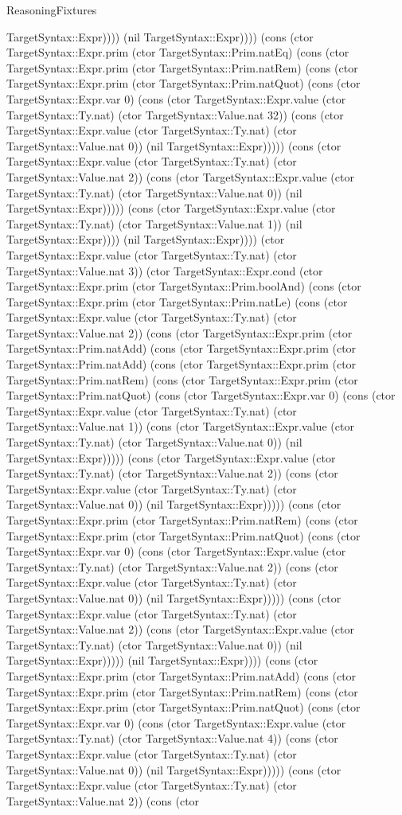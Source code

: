 \begin{lexlean}{ReasoningFixtures}
\begin{semanticmodule}
{TargetSyntax::Expr)))) (nil TargetSyntax::Expr)))) (cons (ctor TargetSyntax::Expr.prim (ctor TargetSyntax::Prim.natEq) (cons (ctor TargetSyntax::Expr.prim (ctor TargetSyntax::Prim.natRem) (cons (ctor TargetSyntax::Expr.prim (ctor TargetSyntax::Prim.natQuot) (cons (ctor TargetSyntax::Expr.var 0) (cons (ctor TargetSyntax::Expr.value (ctor TargetSyntax::Ty.nat) (ctor TargetSyntax::Value.nat 32)) (cons (ctor TargetSyntax::Expr.value (ctor TargetSyntax::Ty.nat) (ctor TargetSyntax::Value.nat 0)) (nil TargetSyntax::Expr))))) (cons (ctor TargetSyntax::Expr.value (ctor TargetSyntax::Ty.nat) (ctor TargetSyntax::Value.nat 2)) (cons (ctor TargetSyntax::Expr.value (ctor TargetSyntax::Ty.nat) (ctor TargetSyntax::Value.nat 0)) (nil TargetSyntax::Expr))))) (cons (ctor TargetSyntax::Expr.value (ctor TargetSyntax::Ty.nat) (ctor TargetSyntax::Value.nat 1)) (nil TargetSyntax::Expr)))) (nil TargetSyntax::Expr)))) (ctor TargetSyntax::Expr.value (ctor TargetSyntax::Ty.nat) (ctor TargetSyntax::Value.nat 3)) (ctor TargetSyntax::Expr.cond (ctor TargetSyntax::Expr.prim (ctor TargetSyntax::Prim.boolAnd) (cons (ctor TargetSyntax::Expr.prim (ctor TargetSyntax::Prim.natLe) (cons (ctor TargetSyntax::Expr.value (ctor TargetSyntax::Ty.nat) (ctor TargetSyntax::Value.nat 2)) (cons (ctor TargetSyntax::Expr.prim (ctor TargetSyntax::Prim.natAdd) (cons (ctor TargetSyntax::Expr.prim (ctor TargetSyntax::Prim.natAdd) (cons (ctor TargetSyntax::Expr.prim (ctor TargetSyntax::Prim.natRem) (cons (ctor TargetSyntax::Expr.prim (ctor TargetSyntax::Prim.natQuot) (cons (ctor TargetSyntax::Expr.var 0) (cons (ctor TargetSyntax::Expr.value (ctor TargetSyntax::Ty.nat) (ctor TargetSyntax::Value.nat 1)) (cons (ctor TargetSyntax::Expr.value (ctor TargetSyntax::Ty.nat) (ctor TargetSyntax::Value.nat 0)) (nil TargetSyntax::Expr))))) (cons (ctor TargetSyntax::Expr.value (ctor TargetSyntax::Ty.nat) (ctor TargetSyntax::Value.nat 2)) (cons (ctor TargetSyntax::Expr.value (ctor TargetSyntax::Ty.nat) (ctor TargetSyntax::Value.nat 0)) (nil TargetSyntax::Expr))))) (cons (ctor TargetSyntax::Expr.prim (ctor TargetSyntax::Prim.natRem) (cons (ctor TargetSyntax::Expr.prim (ctor TargetSyntax::Prim.natQuot) (cons (ctor TargetSyntax::Expr.var 0) (cons (ctor TargetSyntax::Expr.value (ctor TargetSyntax::Ty.nat) (ctor TargetSyntax::Value.nat 2)) (cons (ctor TargetSyntax::Expr.value (ctor TargetSyntax::Ty.nat) (ctor TargetSyntax::Value.nat 0)) (nil TargetSyntax::Expr))))) (cons (ctor TargetSyntax::Expr.value (ctor TargetSyntax::Ty.nat) (ctor TargetSyntax::Value.nat 2)) (cons (ctor TargetSyntax::Expr.value (ctor TargetSyntax::Ty.nat) (ctor TargetSyntax::Value.nat 0)) (nil TargetSyntax::Expr))))) (nil TargetSyntax::Expr)))) (cons (ctor TargetSyntax::Expr.prim (ctor TargetSyntax::Prim.natAdd) (cons (ctor TargetSyntax::Expr.prim (ctor TargetSyntax::Prim.natRem) (cons (ctor TargetSyntax::Expr.prim (ctor TargetSyntax::Prim.natQuot) (cons (ctor TargetSyntax::Expr.var 0) (cons (ctor TargetSyntax::Expr.value (ctor TargetSyntax::Ty.nat) (ctor TargetSyntax::Value.nat 4)) (cons (ctor TargetSyntax::Expr.value (ctor TargetSyntax::Ty.nat) (ctor TargetSyntax::Value.nat 0)) (nil TargetSyntax::Expr))))) (cons (ctor TargetSyntax::Expr.value (ctor TargetSyntax::Ty.nat) (ctor TargetSyntax::Value.nat 2)) (cons (ctor }
\end{semanticmodule}
\end{lexlean}
